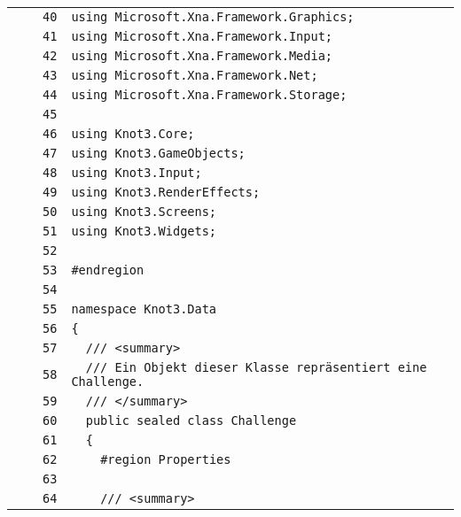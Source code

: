 \documentclass[a4paper,10pt]{article}
\begin{document}
\begin{longtable}[l]{lrrl}
\cellcolor{gray} &  & \verb~40~ & \verb~using Microsoft.Xna.Framework.Graphics;~\\
\cellcolor{gray} &  & \verb~41~ & \verb~using Microsoft.Xna.Framework.Input;~\\
\cellcolor{gray} &  & \verb~42~ & \verb~using Microsoft.Xna.Framework.Media;~\\
\cellcolor{gray} &  & \verb~43~ & \verb~using Microsoft.Xna.Framework.Net;~\\
\cellcolor{gray} &  & \verb~44~ & \verb~using Microsoft.Xna.Framework.Storage;~\\
\cellcolor{gray} &  & \verb~45~ & \verb~~\\
\cellcolor{gray} &  & \verb~46~ & \verb~using Knot3.Core;~\\
\cellcolor{gray} &  & \verb~47~ & \verb~using Knot3.GameObjects;~\\
\cellcolor{gray} &  & \verb~48~ & \verb~using Knot3.Input;~\\
\cellcolor{gray} &  & \verb~49~ & \verb~using Knot3.RenderEffects;~\\
\cellcolor{gray} &  & \verb~50~ & \verb~using Knot3.Screens;~\\
\cellcolor{gray} &  & \verb~51~ & \verb~using Knot3.Widgets;~\\
\cellcolor{gray} &  & \verb~52~ & \verb~~\\
\cellcolor{gray} &  & \verb~53~ & \verb~#endregion~\\
\cellcolor{gray} &  & \verb~54~ & \verb~~\\
\cellcolor{gray} &  & \verb~55~ & \verb~namespace Knot3.Data~\\
\cellcolor{gray} &  & \verb~56~ & \verb~{~\\
\cellcolor{gray} &  & \verb~57~ & \verb~  /// <summary>~\\
\cellcolor{gray} &  & \verb~58~ & \verb~  /// Ein Objekt dieser Klasse repräsentiert eine Challenge.~\\
\cellcolor{gray} &  & \verb~59~ & \verb~  /// </summary>~\\
\cellcolor{gray} &  & \verb~60~ & \verb~  public sealed class Challenge~\\
\cellcolor{gray} &  & \verb~61~ & \verb~  {~\\
\cellcolor{gray} &  & \verb~62~ & \verb~    #region Properties~\\
\cellcolor{gray} &  & \verb~63~ & \verb~~\\
\cellcolor{gray} &  & \verb~64~ & \verb~    /// <summary>~\\

\end{longtable}
\end{document}
